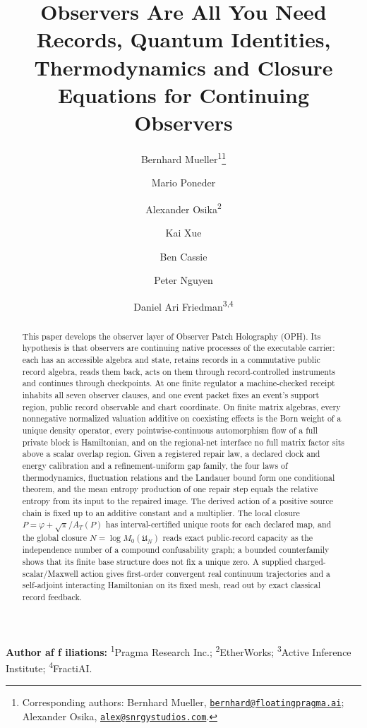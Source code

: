 \documentclass[11pt]{article}
\title{Observers Are All You Need\\[0.4em]\large Records, Quantum Identities, Thermodynamics and Closure Equations for Continuing Observers}
\author{Bernhard Mueller\textsuperscript{1}\thanks{\protect\raggedright Corresponding authors: Bernhard Mueller,
\href{mailto:bernhard@floatingpragma.ai}{\texttt{bernhard@floatingpragma.ai}};
Alexander Osika, \href{mailto:alex@snrgystudios.com}{\texttt{alex@snrgystudios.com}}.}
\and Mario Poneder \and Alexander Osika\textsuperscript{2} \and Kai Xue \and Ben Cassie \and Peter Nguyen \and Daniel Ari Friedman\textsuperscript{3,4}}
\date{\OPHPaperReleaseDate}
\begin{document}
\maketitle
\OPHPaperReleaseBanner

\begin{center}
\small\textbf{Author af\kern0pt f\kern0pt iliations:} \textsuperscript{1}Pragma Research Inc.; \textsuperscript{2}EtherWorks; \textsuperscript{3}Active Inference Institute; \textsuperscript{4}FractiAI.
\end{center}

\begin{abstract}
This paper develops the observer layer of Observer Patch Holography (OPH). Its
hypothesis is that observers are continuing native processes of the
executable carrier: each has an accessible algebra and state, retains records
in a commutative public record algebra, reads them back, acts on them through
record-controlled instruments and continues through checkpoints. At one finite
regulator a machine-checked receipt inhabits all seven observer clauses, and
one event packet fixes an event's support region, public record observable and
chart coordinate. On finite matrix algebras, every nonnegative normalized
valuation additive on coexisting effects is the Born weight of a unique
density operator, every pointwise-continuous automorphism flow of a full
private block is Hamiltonian, and on the regional-net interface no full
matrix factor sits above a scalar overlap region. Given a registered repair law, a declared clock and
energy calibration and a refinement-uniform gap family, the four laws of
thermodynamics, fluctuation relations and the Landauer bound form one
conditional theorem, and the mean entropy production of one repair step equals
the relative entropy from its input to the repaired image. The derived action
of a positive source chain is fixed up to an additive constant and a
multiplier. The local closure \(P=\varphi+\sqrt\pi/A_T(P)\) has interval-certified
unique roots for each declared map, and the global closure
\(N=\log M_0(\mathfrak U_N)\) reads exact public-record capacity as the
independence number of a compound confusability graph; a bounded counterfamily
shows that its finite base structure does not fix a unique zero. A supplied
charged-scalar/Maxwell action gives first-order convergent real continuum
trajectories and a self-adjoint interacting Hamiltonian on its fixed mesh,
read out by exact classical record feedback.
\end{abstract}
\end{document}
